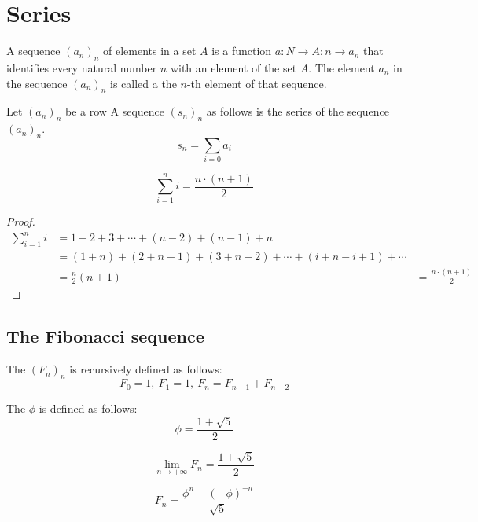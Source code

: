 \documentclass[main.tex]{subfiles}
\begin{document}
\chapter{Series}

\begin{de}
    A sequence $(a_{n})_{n}$ of elements in a set $A$ is a function $a: N
    \rightarrow A: n \rightarrow a_{n}$ that identifies every natural number $n$ with an element of
    the set $A$. The element $a_{n}$ in the sequence $(a_{n})_{n}$ is called a the
    $n$-th element of that sequence.
\end{de}

\begin{de}
    Let $(a_{n})_{n}$ be a row
    A sequence $(s_{n})_{n}$ as follows is the series of the sequence $(a_{n})_{n}$.
    \[ s_{n} = \sum_{i=0}a_{i} \]
\end{de}

\begin{pr}
    \label{pr:sum-of-first-n-natural-numbers}
    \[
        \sum_{i=1}^n i = \frac{n\cdot(n+1)}{2}
    \]
    \begin{proof}
        \begin{align*}
            \sum_{i=1}^n i
            &= 1 + 2 + 3 + \dotsb + (n-2) + (n-1) + n\\
            &= (1 + n) + (2+n-1) + (3+n-2) + \dotsb + (i+n-i+1) + \dotsb\\
            &= \frac{n}{2} (n+1)
            &= \frac{n\cdot(n+1)}{2}
        \end{align*}
    \end{proof}
\end{pr}


\section{The Fibonacci sequence}

\begin{de}
  The  $(F_{n})_{n}$ is recursively defined as follows:
  \[ F_{0} = 1,\ F_{1} = 1,\ F_{n} = F_{n-1} + F_{n-2} \]
\end{de}

\begin{de}
  The  $\phi$ is defined as follows:
  \[ \phi = \frac{1 + \sqrt{5}}{2} \]
\end{de}

\begin{prop}
  \[ \lim_{n \rightarrow +\infty}F_{n} = \frac{1 + \sqrt{5}}{2} \]
\end{prop}

\begin{prop}
  \[ F_{n} = \frac{\phi^{n} - (-\phi)^{-n}}{\sqrt{5}} \]
\end{prop}
\end{document}

